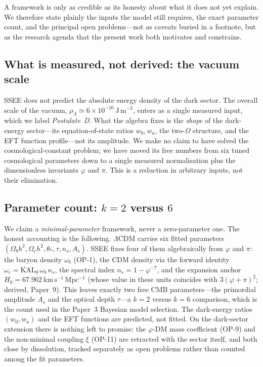 \documentclass[aps,prd,preprint,amsmath,amssymb,nofootinbib,longbibliography]{revtex4-2}
\newcommand{\kms}{\mathrm{km\,s^{-1}\,Mpc^{-1}}}
\begin{document}
A framework is only as credible as its honesty about what it does not yet
explain. We therefore state plainly the inputs the model still requires, the
exact parameter count, and the principal open problems---not as caveats buried
in a footnote, but as the research agenda that the present work both motivates
and constrains.

\subsection{What is measured, not derived: the vacuum scale}

SSEE does not predict the absolute energy density of the dark sector. The
overall scale of the vacuum, $\rho_\Lambda\simeq6\times10^{-10}~\mathrm{J\,
m^{-3}}$, enters as a single measured input, which we label \emph{Postulate~D}.
What the algebra fixes is the \emph{shape} of the dark-energy sector---its
equation-of-state ratios $w_0,w_a$, the two-$\Omega$ structure, and the EFT
function profile---not its amplitude. We make no claim to have solved the
cosmological-constant problem; we have moved its free numbers from six tuned
cosmological parameters down to a single measured normalisation plus the
dimensionless invariants $\varphi$ and $\pi$. This is a reduction in arbitrary
inputs, not their elimination.

\subsection{Parameter count: $k=2$ versus $6$}

We claim a \emph{minimal-parameter} framework, never a zero-parameter one. The
honest accounting is the following. $\Lambda$CDM carries six fitted parameters
$(\Omega_b h^2,\Omega_c h^2,\theta_*,\tau,n_s,A_s)$. SSEE fixes four of them
algebraically from $\varphi$ and $\pi$: the baryon density $\omega_b$ (OP-1), the
CDM density via the forward identity $\omega_c=\mathrm{KAL}_0\,\omega_b\,n_s$, the
spectral index $n_s=1-\varphi^{-7}$, and the expansion anchor $H_0=67.962~\kms$
(whose value in these units coincides with $3(\varphi+\pi)^2$; derived, Paper~9). This leaves exactly two free CMB parameters---the primordial
amplitude $A_s$ and the optical depth $\tau$---a $k=2$ versus $k=6$ comparison,
which is the count used in the Paper~3 Bayesian model selection. The dark-energy
ratios $(w_0,w_a)$ and the EFT functions are predicted, not fitted. On the
dark-sector extension there is nothing left to promise: the $\varphi$-DM mass
coefficient (OP-9) and the non-minimal coupling $\xi$ (OP-11) are retracted
with the sector itself, and both close by dissolution, tracked separately
as open problems rather than counted among the fit parameters.
\end{document}
